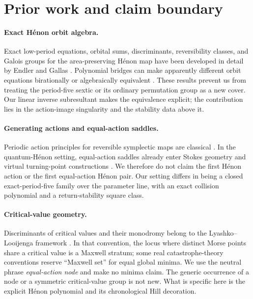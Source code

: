 \section{Prior work and claim boundary}

\paragraph{Exact H\'enon orbit algebra.}
Exact low-period equations, orbital sums, discriminants, reversibility
classes, and Galois groups for the area-preserving H\'enon map have been
developed in detail by Endler and Gallas
\citep{endlergallas2002,endlergallas2006sums}.  Polynomial bridges can make
apparently different orbit equations birationally or algebraically
equivalent \citep{brison2018}.  These results prevent us from treating the
period-five sextic or its ordinary permutation group as a new cover.  Our
linear inverse subresultant makes the equivalence explicit; the contribution
lies in the action-image singularity and the stability data above it.

\paragraph{Generating actions and equal-action saddles.}
Periodic action principles for reversible symplectic maps are classical
\citep{kookmeiss1989}.  In the quantum-H\'enon setting, equal-action saddles
already enter Stokes geometry and virtual turning-point constructions
\citep{shudoikeda2008}.  We therefore do not claim the first H\'enon action
or the first equal-action H\'enon pair.  Our setting differs in being a
closed exact-period-five family over the parameter line, with an exact
collision polynomial and a return-stability square class.

\paragraph{Critical-value geometry.}
Discriminants of critical values and their monodromy belong to the
Lyashko--Looijenga framework \citep{looijenga1974}.  In that convention, the
locus where distinct Morse points share a critical value is a Maxwell
stratum; some real catastrophe-theory conventions reserve ``Maxwell set''
for equal global minima.  We use the neutral phrase \emph{equal-action
node} and make no minima claim.  The generic occurrence of a node or a
symmetric critical-value group is not new.  What is specific here is the
explicit H\'enon polynomial and its chronological Hill decoration.

